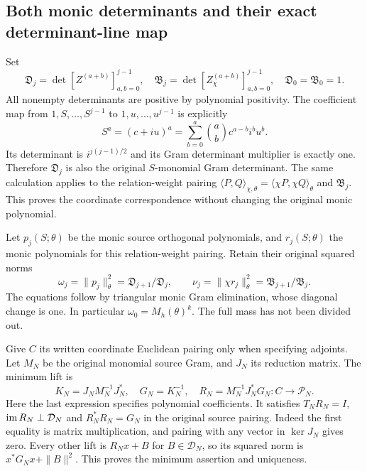 \subsection[\hspace{0.4em}Both monic determinants and their exact determinant-line map]{Both monic determinants and their exact determinant-line map}

Set
\[
 \mathfrak D_j=\det[Z^{(a+b)}]_{a,b=0}^{j-1},\quad
 \mathfrak B_j=\det[Z_\chi^{(a+b)}]_{a,b=0}^{j-1},\quad
 \mathfrak D_0=\mathfrak B_0=1.
 \tag{TVB.11}
\]
All nonempty determinants are positive by polynomial positivity.
The coefficient map from $1,S,\ldots,S^{j-1}$ to
$1,u,\ldots,u^{j-1}$ is explicitly
\[
 S^a=(c+iu)^a=\sum_{b=0}^a\binom ab c^{a-b}i^b u^b.
 \tag{TVB.12}
\]
Its determinant is $i^{j(j-1)/2}$ and its Gram determinant
multiplier is exactly one. Therefore $\mathfrak D_j$ is also
the original $S$-monomial Gram determinant. The same calculation
applies to the relation-weight pairing
$\langle P,Q\rangle_{\chi,\theta}=\langle\chi P,\chi Q\rangle_\theta$
and $\mathfrak B_j$. This proves the coordinate correspondence
without changing the original monic polynomial.

Let $p_j(S;\theta)$ be the monic source orthogonal polynomials,
and $r_j(S;\theta)$ the monic polynomials for this relation-weight
pairing. Retain their original squared norms
\[
 \omega_j=\|p_j\|_\theta^2=\mathfrak D_{j+1}/\mathfrak D_j,
 \qquad\nu_j=\|\chi r_j\|_\theta^2
               =\mathfrak B_{j+1}/\mathfrak B_j.
 \tag{TVB.13}
\]
The equations follow by triangular monic Gram elimination, whose
diagonal change is one. In particular $\omega_0=M_h(\theta)^k$.
The full mass has not been divided out.

Give $C$ its written coordinate Euclidean pairing only when
specifying adjoints. Let $M_N$ be the original monomial source
Gram, and $J_N$ its reduction matrix. The minimum lift is
\[
 K_N=J_NM_N^{-1}J_N^*,\quad G_N=K_N^{-1},\quad
 R_N=M_N^{-1}J_N^*G_N:C\longrightarrow\mathcal P_N.
 \tag{TVB.14}
\]
Here the last expression specifies polynomial coefficients.
It satisfies $T_NR_N=I$, $\operatorname{im} R_N\perp\mathcal D_N$ and
$R_N^*R_N=G_N$ in the original source pairing. Indeed the first
equality is matrix multiplication, and pairing with any vector
in $\ker J_N$ gives zero. Every other lift is $R_Nx+B$ for
$B\in\mathcal D_N$, so its squared norm is
$x^*G_Nx+\|B\|^2$. This proves the minimum assertion and
uniqueness.

